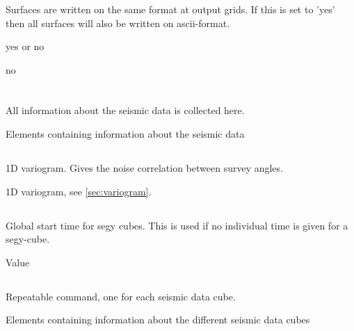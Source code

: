 \subsubsection{}
\slist
   \item \Description Surfaces are written on the same format at output grids.
	If this is set to 'yes' then all surfaces will also be written on ascii-format.
   \item \Argument yes or no
   \item \Default no
\elist


 \section{\necessary} 
 \slist
   \item \Description All information about the seismic data is collected here.
   \item \Argument Elements containing information about the seismic data
   \item \Default
 \elist

 \subsection{}
 \slist
   \item \Description 1D variogram. Gives the noise correlation between survey angles.
   \item \Argument 1D variogram, see \autoref{sec:variogram}.
   \item \Default
 \elist

 \subsection{}
 \slist
   \item \Description Global start time for segy cubes. This is used if no individual time is given for a segy-cube.
   \item \Argument Value
   \item {}
 \elist

\subsection{\necessary}
 \slist
   \item \Description Repeatable command, one for each seismic data cube.
   \item \Argument Elements containing information about the different seismic data cubes
   \item \Default
 \elist

